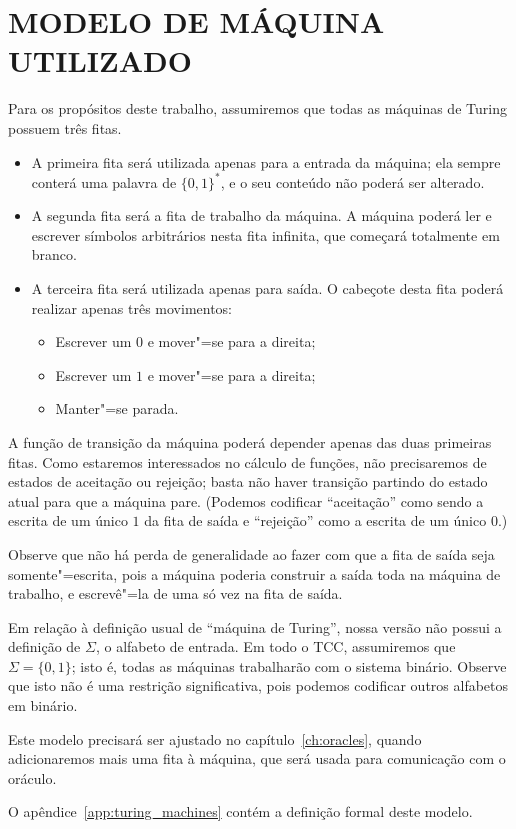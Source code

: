 \section{MODELO DE MÁQUINA UTILIZADO}
\label{sec:machine_model}

Para os propósitos deste trabalho,
assumiremos que todas as máquinas de Turing possuem três fitas.
\begin{itemize}
    \item A primeira fita será utilizada apenas para a entrada da máquina;
        ela sempre conterá uma palavra de $\{0, 1\}^*$,
        e o seu conteúdo não poderá ser alterado.
    \item A segunda fita será a fita de trabalho da máquina.
        A máquina poderá ler e escrever símbolos arbitrários nesta fita infinita,
        que começará totalmente em branco.
    \item A terceira fita será utilizada apenas para saída.
        O cabeçote desta fita poderá realizar apenas três movimentos:
        \begin{itemize}
            \item Escrever um $0$ e mover"=se para a direita;
            \item Escrever um $1$ e mover"=se para a direita;
            \item Manter"=se parada.
        \end{itemize}
\end{itemize}

A função de transição da máquina poderá depender apenas das duas primeiras fitas.
Como estaremos interessados no cálculo de funções,
não precisaremos de estados de aceitação ou rejeição;
basta não haver transição partindo do estado atual para que a máquina pare.
(Podemos codificar ``aceitação'' como sendo a escrita de um único $1$ da fita de saída
e ``rejeição'' como a escrita de um único $0$.)

Observe que não há perda de generalidade
ao fazer com que a fita de saída seja somente"=escrita,
pois a máquina poderia construir a saída toda na máquina de trabalho,
e escrevê"=la de uma só vez na fita de saída.

Em relação à definição usual de ``máquina de Turing'',
nossa versão não possui a definição de $\Sigma$,
o alfabeto de entrada.
Em todo o TCC,
assumiremos que $\Sigma = \{0, 1\}$;
isto é, todas as máquinas trabalharão com o sistema binário.
Observe que isto não é uma restrição significativa,
pois podemos codificar outros alfabetos em binário.

Este modelo precisará ser ajustado no capítulo~\ref{ch:oracles},
quando adicionaremos mais uma fita à máquina,
que será usada para comunicação com o oráculo.

O apêndice~\ref{app:turing_machines}
contém a definição formal deste modelo.
